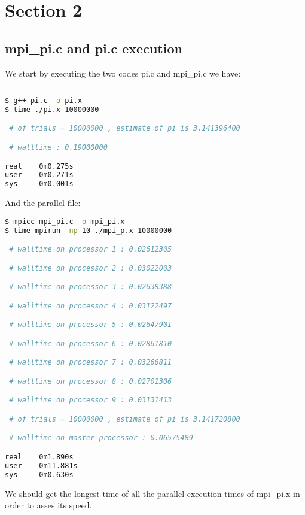 \documentclass[11pt]{scrartcl} %
\begin{document}
\section{Section 2}

\subsection{mpi\_pi.c and pi.c execution}
We start by executing the two codes pi.c and mpi\_pi.c we have:

\begin{lstlisting}[language=bash]
  
$ g++ pi.c -o pi.x
$ time ./pi.x 10000000

 # of trials = 10000000 , estimate of pi is 3.141396400 

 # walltime : 0.19000000 

real    0m0.275s
user    0m0.271s
sys     0m0.001s
\end{lstlisting}
And the parallel file:
\begin{lstlisting}[language=bash]
$ mpicc mpi_pi.c -o mpi_pi.x
$ time mpirun -np 10 ./mpi_p.x 10000000

 # walltime on processor 1 : 0.02612305 

 # walltime on processor 2 : 0.03022003 

 # walltime on processor 3 : 0.02638388 

 # walltime on processor 4 : 0.03122497 

 # walltime on processor 5 : 0.02647901 

 # walltime on processor 6 : 0.02861810 

 # walltime on processor 7 : 0.03266811 

 # walltime on processor 8 : 0.02701306 

 # walltime on processor 9 : 0.03131413 

 # of trials = 10000000 , estimate of pi is 3.141720800 

 # walltime on master processor : 0.06575489 

real    0m1.890s
user    0m11.881s
sys     0m0.630s
\end{lstlisting}

We should get the longest time of all the parallel execution times of mpi\_pi.x in order to asses its speed.
\end{document}
